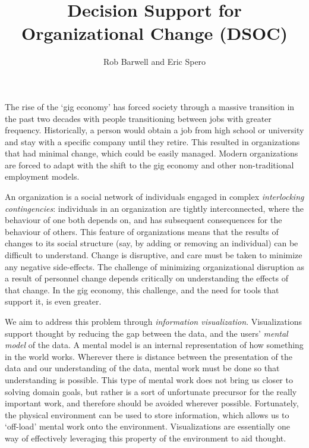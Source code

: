 \documentclass[journal]{vgtc}                %
\title{Decision Support for Organizational Change (DSOC)}
\author{Rob Barwell and Eric Spero}
\begin{document}

\maketitle

The rise of the \lq gig economy\rq{}\cite{de2015rise,friedman2014workers} has forced society through a massive transition in the past two decades with people transitioning between jobs with greater frequency.  Historically, a person would obtain a job from high school or university and stay with a specific company until they retire.  This resulted in organizations that had minimal change, which could be easily managed. Modern organizations are forced to adapt with the shift to the gig economy and other non-traditional employment models.  

An organization is a social network\cite{scott1988social} of individuals engaged in complex \emph{interlocking contingencies}\cite{glenn2006complexity}: individuals in an organization are tightly interconnected, where the behaviour of one both depends on, and has subsequent consequences for the behaviour of others\cite{glenn2006complexity}. This feature of organizations means that the results of changes to its social structure (say, by adding or removing an individual) can be difficult to understand. Change is disruptive, and care must be taken to minimize any negative side-effects. The challenge of minimizing organizational disruption as a result of personnel change depends critically on understanding the effects of that change. In the gig economy, this challenge, and the need for tools that support it, is even greater. 

We aim to address this problem through \emph{information visualization}. Visualizations support thought by reducing the gap between the data, and the users' \emph{mental model} of the data\cite{yi2007toward}. A mental model is an internal representation of how something in the world works\cite{staggersmodel,norman2014some}. Wherever there is distance between the presentation of the data and our understanding of the data, mental work must be done so that understanding is possible. This type of mental work does not bring us closer to solving domain goals, but rather is a sort of unfortunate precursor for the really important work, and therefore should be avoided wherever possible\cite{paas2003cognitive}. Fortunately, the physical environment can be used to store information, which allows us to \lq off-load\rq{} mental work onto the environment\cite{wilson2002six}. Visualizations are essentially one way of effectively leveraging this property of the environment to aid thought.
\end{document}
